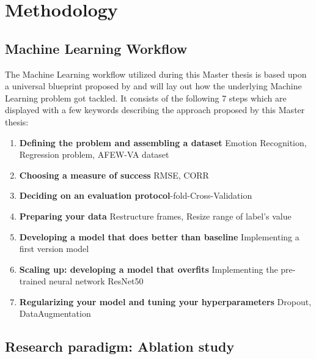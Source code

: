 \chapter{Methodology}


\section{Machine Learning Workflow}
The Machine Learning workflow utilized during this Master thesis is based upon a universal blueprint proposed by \citet{Chollet:2017:DeepLearningPython} and will lay out how the underlying Machine Learning problem got tackled. It consists of the following 7 steps which are displayed with a few keywords describing the approach proposed by this Master thesis:

\begin{enumerate}
    \item \textbf{Defining the problem and assembling a dataset}\newline
    Emotion Recognition, Regression problem, AFEW-VA dataset
    \item \textbf{Choosing a measure of success}\newline
    RMSE, CORR
    \item \textbf{Deciding on an evaluation protocol}-fold-Cross-Validation
    \item \textbf{Preparing your data}\newline
    Restructure frames, Resize range of label's value
    \item \textbf{Developing a model that does better than baseline}\newline
    Implementing a first version model
    \item \textbf{Scaling up: developing a model that overfits}\newline
    Implementing the pre-trained neural network ResNet50
    \item \textbf{Regularizing your model and tuning your hyperparameters}\newline
    Dropout, DataAugmentation
\end{enumerate}



\section{Research paradigm: Ablation study}

